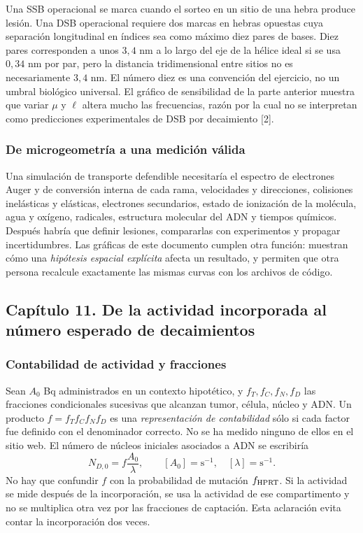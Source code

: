 \documentclass[11pt,a4paper,oneside]{article}
\begin{document}
Una SSB operacional se marca cuando el sorteo en un sitio de una hebra
produce lesión. Una DSB operacional requiere dos marcas en hebras opuestas
cuya separación longitudinal en índices sea como máximo diez pares de bases.
Diez pares corresponden a unos $3,4$ nm a lo largo del eje de la hélice
ideal si se usa $0,34$ nm por par, pero la distancia tridimensional entre
sitios no es necesariamente $3,4$ nm. El número diez es una convención
del ejercicio, no un umbral biológico universal. El gráfico de sensibilidad
de la parte anterior muestra que variar $\mu$ y $\ell$ altera mucho las
frecuencias, razón por la cual no se interpretan como predicciones
experimentales de DSB por decaimiento [2].

\subsubsection{De microgeometría a una medición válida}
Una simulación de transporte defendible necesitaría el espectro de electrones
Auger y de conversión interna de cada rama, velocidades y direcciones,
colisiones inelásticas y elásticas, electrones secundarios, estado de
ionización de la molécula, agua y oxígeno, radicales, estructura molecular
del ADN y tiempos químicos. Después habría que definir lesiones,
compararlas con experimentos y propagar incertidumbres. Las gráficas de
este documento cumplen otra función: muestran cómo una \emph{hipótesis
espacial explícita} afecta un resultado, y permiten que otra persona
recalcule exactamente las mismas curvas con los archivos de código.

\clearpage
\subsection{Capítulo 11. De la actividad incorporada al número esperado de decaimientos}
\label{ampliacion-compartimentos}

\subsubsection{Contabilidad de actividad y fracciones}
Sean $A_0$ Bq administrados en un contexto hipotético, y $f_T,f_C,f_N,f_D$
las fracciones condicionales sucesivas que alcanzan tumor, célula, núcleo
y ADN. Un producto $f=f_Tf_Cf_Nf_D$ es una \emph{representación de
contabilidad} sólo si cada factor fue definido con el denominador correcto.
No se ha medido ninguno de ellos en el sitio web. El número de núcleos
iniciales asociados a ADN se escribiría
\[
N_{D,0}=f\frac{A_0}{\lambda},
\qquad [A_0]=\mathrm{s^{-1}},\quad[\lambda]=\mathrm{s^{-1}}.
\]
No hay que confundir $f$ con la probabilidad de mutación $f_{\rm HPRT}$.
Si la actividad se mide después de la incorporación, se usa la actividad
de ese compartimento y no se multiplica otra vez por las fracciones de
captación. Esta aclaración evita contar la incorporación dos veces.
\end{document}
